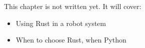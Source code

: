\label{ch:rust3}
\begin{keyidea}
This chapter is not written yet. It will cover:
\begin{itemize}[nosep]
  \item Using Rust in a robot system
  \item When to choose Rust, when Python
\end{itemize}
\end{keyidea}
